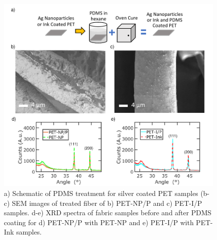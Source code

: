 \documentclass[journal=jacsat,manuscript=article]{achemso}
\begin{document}
\begin{figure}[H]
       \centering
    \includegraphics[width= \linewidth]{Figures/fig3_char.pdf}
\caption[SEM2]{a) Schematic of PDMS treatment for silver coated PET samples (b-c) SEM images of treated fiber of b) PET-NP/P and c) PET-I/P samples. d-e) XRD spectra of fabric samples before and after PDMS coating for d) PET-NP/P with PET-NP and e) PET-I/P with PET-Ink samples.}

\label{fig:wet}
\end{figure}
\end{document}
